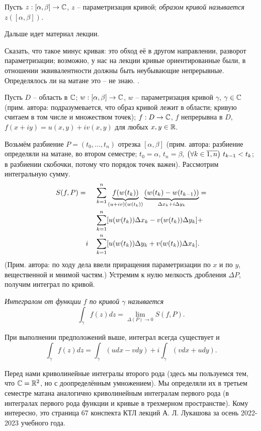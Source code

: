 \begin{definition}
	Пусть $z: [\alpha, \beta] \to \mathbb{C}$, $z$ -- параметризация кривой; \it{образом кривой} называется $z([\alpha, \beta])$.
\end{definition}

Дальше идет материал лекции.

{\color{red} Сказать, что такое минус кривая: это обход её в другом направлении, разворот параметризации; возможно, у нас на лекции кривые ориентированные были, в отношении эквивалентности должны быть неубывающие непрерывные. Определялось ли на матане это -- не знаю. }.

Пусть $D$ -- область в $\mathbb{C}$; $w: [\alpha, \beta] \to \mathbb{C}$, $w$ -- параметризация кривой $\gamma$, $\gamma \in \mathbb{C}$ (прим. автора: подразумевается, что образ кривой лежит в области; кривую считаем в том числе и множеством точек); $f: D \to \mathbb{C}$, $f$ непрерывна в $D$, $f(x + iy) = u(x, y) + iv(x, y)$ для любых $x, y \in \mathbb{R}$.

Возьмём разбиение $P = (t_0, \ldots, t_n)$ отрезка $[\alpha, \beta]$ (прим. автора: разбиение определяли на матане, во втором семестре; $t_0 = \alpha$, $t_n = \beta$, $\mathopen{}\left( \forall k \in \overline{1, n} \right)\mathclose{} \,\, t_{k - 1} < t_k$; в разбиении скобочки, потому что порядок точек важен). Рассмотрим интегральную сумму.
\[
	\begin{aligned}
		S(f, P) = & && \sum_{k = 1}^n \underbrace{f(w(t_k))}_{(u+iv)(w(t_k))} \underbrace{\mathopen{}\left( w(t_k) - w(t_{k - 1}) \right)\mathclose{}}_{\Delta x_k + i \Delta y_k} = \\
		& && \sum_{k = 1}^n \mathopen{}\left[ u(w(t_k)) \Delta x_k - v(w(t_k)) \Delta y_k \right]\mathclose{} + \\
		& i && \sum_{k = 1}^n \mathopen{}\left[ u(w(t_k)) \Delta y_k + v(w(t_k)) \Delta x_k \right]\mathclose{}.
	\end{aligned}
\]
(Прим. автора: по ходу дела ввели приращения параметризации по $x$ и по $y$, вещественной и мнимой частям.) Устремим к нулю мелкость дробления $\Delta P$, получим интеграл по кривой.

\begin{definition}
	\it{Интегралом от функции $f$ по кривой $\gamma$} называется \[
		\int_\gamma f(z) dz = \lim_{\Delta(P) \to 0} S(f, P).
	\]
\end{definition}
\begin{note}
	При выполнении предположений выше, интеграл всегда существует и
	\[
		\int_\gamma f(z) dz = \int_\gamma (u dx - v dy) + i \int_\gamma (v dx + u dy).
	\]
\end{note}
\begin{anote}
	Перед нами криволинейные интегралы второго рода (здесь мы пользуемся тем, что $\mathbb{C} = \mathbb{R}^2$, но с доопределённым умножением). Мы определяли их в третьем семестре матана аналогично криволинейным интегралам первого рода (в интегралах первого рода функции и кривые в трехмерном пространстве). Кому интересно, это страница 67 конспекта КТЛ лекций А. Л. Лукашова за осень 2022-2023 учебного года.
\end{anote}

